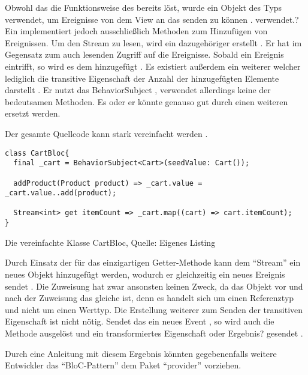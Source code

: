 Obwohl das  die Funktionsweise des  bereits löst,
wurde ein Objekt des Typs  verwendet,
um Ereignisse von dem View an das  senden zu können .  verwendet.?
Ein  implementiert jedoch ausschließlich Methoden zum Hinzufügen von Ereignissen. Um den Stream zu lesen,
wird ein  dazugehöriger  erstellt .
Er hat im Gegensatz zum  auch lesenden Zugriff auf die Ereignisse.
Sobald ein Ereignis eintrifft,
so wird es dem   hinzugefügt .
Es existiert außerdem ein weiterer   welcher lediglich die transitive Eigenschaft der Anzahl der hinzugefügten Elemente darstellt . 
Er nutzt das BehaviorSubject ,
verwendet allerdings keine der bedeutsamen Methoden.
Es oder er könnte genauso gut durch einen weiteren  ersetzt werden.

Der gesamte Quellcode kann stark vereinfacht werden \Lst{\ref{lst:CartBlocVereinfacht}}.
\ifIncludeFigures
  \begin{listing}[h]
    \begin{verbatim}
class CartBloc{
  final _cart = BehaviorSubject<Cart>(seedValue: Cart());

  addProduct(Product product) => _cart.value = _cart.value..add(product);

  Stream<int> get itemCount => _cart.map((cart) => cart.itemCount);
}
\end{verbatim}
    \caption[Die vereinfachte Klasse CartBloc]{Die vereinfachte Klasse CartBloc, Quelle: Eigenes Listing}
    \label{lst:CartBlocVereinfacht}
  \end{listing}
\fi

Durch Einsatz der für das  einzigartigen Getter-Methode  kann dem \enquote{Stream} ein neues Objekt hinzugefügt werden,
wodurch er gleichzeitig ein neues Ereignis sendet .
Die Zuweisung hat zwar ansonsten keinen Zweck,
da das Objekt vor und nach der Zuweisung das gleiche ist,
denn es handelt sich um einen Referenztyp und nicht um einen Werttyp.
Die Erstellung weiterer  zum Senden der transitiven Eigenschaft  ist nicht nötig.
Sendet das   ein neues Event ,
so wird auch die Methode  ausgelöst und ein transformiertes Eigenschaft oder Ergebnis? gesendet .

Durch eine Anleitung mit diesem Ergebnis könnten gegebenenfalls weitere Entwickler das \enquote{BloC-Pattern} dem Paket \enquote{provider} vorziehen.

